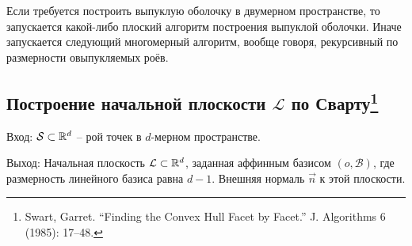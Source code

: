 \documentclass[a4paper,12pt]{article}
\newcommand{\R}[1][]{%
  \ifthenelse{\equal{#1}{}}%
  {\mathbb{R}}%
  {\mathbb{R}^{#1}}}
\newcommand{\Swarm}{\mathcal{S}}              %
\newcommand{\Basis}{\mathcal{B}}              %
\newcommand{\Plane}{\mathcal{L}}           %
\renewcommand{\.}{\hspace{0.2ex}}
\begin{document}
  Если требуется построить выпуклую оболочку в двумерном пространстве, то запускается какой-либо плоский алгоритм построения выпуклой оболочки. Иначе запускается следующий многомерный алгоритм, вообще говоря, рекурсивный по размерности овыпукляемых роёв.

  \subsection{Построение начальной плоскости $\Plane$ по Сварту\footnote{Swart, Garret. ``Finding the Convex Hull Facet by Facet.'' J. Algorithms 6 (1985): 17--48.}}
    \label{InitialPlaneSwart}

    Вход: $\Swarm \subset \R[d]$ -- рой точек в $d$-мерном пространстве.

    Выход: Начальная плоскость $\Plane \subset \R[d]$, заданная аффинным базисом $(o,\Basis)$, где размерность линейного базиса равна $d-1$. Внешняя нормаль $\vec n$ к этой плоскости.
\end{document}
